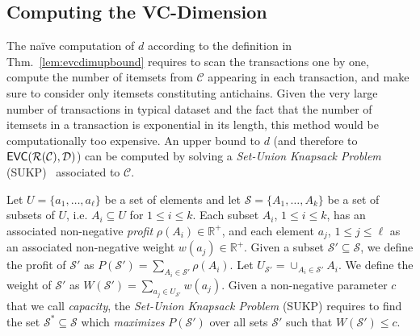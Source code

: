\subsection{Computing the VC-Dimension}\label{sec:computvc}
The na\"ive computation of $d$  according to the definition in Thm.~\ref{lem:evcdimupbound}
requires to scan the transactions one by one, 
compute the number of itemsets from $\mathcal{C}$ appearing in each
transaction, and make sure to consider only itemsets constituting antichains. Given the very large
number of transactions in typical dataset and the fact that the number of
itemsets in a transaction is exponential in its length, this method would be
computationally too expensive. An upper bound to $d$ (and therefore to
$\mathsf{EVC}(\mathcal{R}(\mathcal{C}),{\cal D})$) can be computed by solving a
\emph{Set-Union Knapsack Problem} (SUKP)~\citep{GoldschmidtNY94} associated to
$\mathcal{C}$.

\begin{definition}\label{def:sukp}
  Let $U=\{a_1,\dotsc,a_\ell\}$ be a set of elements and let
  $\mathcal{S}=\{A_1,\dotsc,A_k\}$ be a set of subsets of $U$, i.e.
  $A_i\subseteq U$ for $1\le i\le k$. Each subset $A_i$, $1\le i\le k$, has an associated
  non-negative \emph{profit} $\rho(A_i)\in\mathbb{R}^+$, and each element $a_j$, $1\le
  j\le\ell$ as an associated non-negative weight $w(a_j)\in\mathbb{R}^+$.
  Given a subset $\mathcal{S}'\subseteq\mathcal{S}$, we define the profit of
  $\mathcal{S}'$ as $P(\mathcal{S}')=\sum_{A_i\in \mathcal{S}'}\rho(A_i)$. Let
  $U_{\mathcal{S}'}=\cup_{A_i\in\mathcal{S}'} A_i$. We
  define the weight of $\mathcal{S}'$ as $W(\mathcal{S}')=\sum_{a_j\in
  U_{\mathcal{S}'}} w(a_j)$. Given a non-negative parameter $c$ that we call
  \emph{capacity}, the \emph{Set-Union Knapsack Problem} (SUKP) requires to find
  the set $\mathcal{S}^*\subseteq\mathcal{S}$ which \emph{maximizes}
  $P(\mathcal{S}')$ over all sets $\mathcal{S}'$ such that $W(\mathcal{S}')\le c$.
\end{definition}

